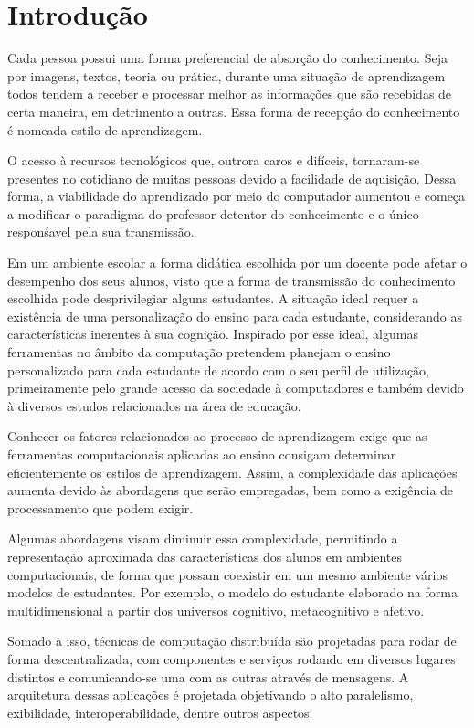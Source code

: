\chapter{Introdução}

Cada pessoa possui uma forma preferencial de absorção do conhecimento. Seja por imagens, textos, teoria ou prática, durante uma situação de aprendizagem todos tendem a receber e processar melhor as informações que são recebidas de certa maneira, em detrimento a outras. Essa forma de recepção do conhecimento é nomeada estilo de aprendizagem.
 
O acesso à recursos tecnológicos que, outrora caros e difíceis, tornaram-se presentes no cotidiano de muitas pessoas devido a facilidade de aquisição. Dessa forma, a viabilidade do aprendizado por meio do computador aumentou e começa a modificar o paradigma do professor detentor do conhecimento e o único responśavel pela sua transmissão.

Em um ambiente escolar a forma didática escolhida por um docente pode afetar o desempenho dos seus alunos, visto que a forma de transmissão do conhecimento escolhida pode desprivilegiar alguns estudantes. A situação ideal requer a existência de uma personalização do ensino para cada estudante, considerando as características inerentes à sua cognição. Inspirado por esse ideal, algumas ferramentas no âmbito da computação pretendem planejam o ensino personalizado para cada estudante de acordo com o seu perfil de utilização, primeiramente pelo grande acesso da sociedade à computadores e também devido à diversos estudos relacionados na área de educação.

Conhecer os fatores relacionados ao processo de aprendizagem exige que as ferramentas computacionais aplicadas ao ensino consigam determinar eficientemente os estilos de aprendizagem. Assim, a complexidade das aplicações aumenta devido às abordagens que serão empregadas, bem como a exigência de processamento que podem exigir.

Algumas abordagens visam diminuir essa complexidade, permitindo a representação aproximada das características dos alunos em ambientes computacionais, de forma que possam coexistir em um mesmo ambiente vários modelos de estudantes. Por exemplo, o modelo do estudante elaborado na forma multidimensional a partir dos universos cognitivo, metacognitivo e afetivo.

Somado à isso, técnicas de computação distribuída são projetadas para rodar de forma descentralizada, com componentes e serviços rodando em diversos lugares distintos e comunicando-se uma com as outras através de mensagens. A arquitetura dessas aplicações é projetada objetivando o alto paralelismo, exibilidade, interoperabilidade, dentre outros aspectos.

